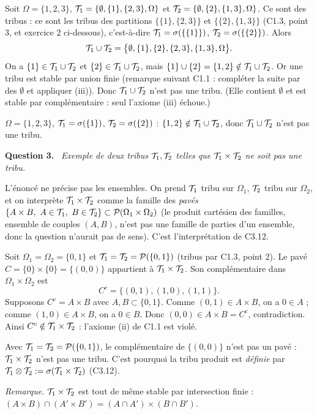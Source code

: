 \documentclass[11pt,a4paper]{article}
\newcommand{\question}[1]{\par\medskip\noindent\textbf{Question #1.}~}
\begin{document}
\begin{exo}
Soit $\Omega=\{1,2,3\}$, $\mathcal{T}_1=\{\emptyset,\{1\},\{2,3\},\Omega\}$ et $\mathcal{T}_2=\{\emptyset,\{2\},\{1,3\},\Omega\}$.
Ce sont des tribus : ce sont les tribus des partitions $\{\{1\},\{2,3\}\}$ et $\{\{2\},\{1,3\}\}$ (C1.3, point 3, et
exercice 2 ci-dessous), c'est-à-dire $\mathcal{T}_1=\sigma(\{\{1\}\})$, $\mathcal{T}_2=\sigma(\{\{2\}\})$. Alors
\[\mathcal{T}_1\cup\mathcal{T}_2=\bigl\{\emptyset,\{1\},\{2\},\{2,3\},\{1,3\},\Omega\bigr\}.\]
On a $\{1\}\in\mathcal{T}_1\cup\mathcal{T}_2$ et $\{2\}\in\mathcal{T}_1\cup\mathcal{T}_2$, mais $\{1\}\cup\{2\}=\{1,2\}\notin\mathcal{T}_1\cup\mathcal{T}_2$.
Or une tribu est stable par union finie (remarque suivant C1.1 : compléter la suite par des $\emptyset$ et appliquer (iii)).
Donc $\mathcal{T}_1\cup\mathcal{T}_2$ n'est pas une tribu. (Elle contient $\emptyset$ et est stable par complémentaire : seul l'axiome (iii) échoue.)
\begin{resultat}
$\Omega=\{1,2,3\}$, $\mathcal{T}_1=\sigma(\{1\})$, $\mathcal{T}_2=\sigma(\{2\})$ : $\{1,2\}\notin\mathcal{T}_1\cup\mathcal{T}_2$, donc $\mathcal{T}_1\cup\mathcal{T}_2$ n'est pas une tribu.
\end{resultat}

\question{3} \emph{Exemple de deux tribus $\mathcal{T}_1,\mathcal{T}_2$ telles que $\mathcal{T}_1\times\mathcal{T}_2$ ne soit pas une tribu.}

\begin{alerte}
L'énoncé ne précise pas les ensembles. On prend $\mathcal{T}_1$ tribu sur $\Omega_1$, $\mathcal{T}_2$ tribu sur $\Omega_2$, et on interprète
$\mathcal{T}_1\times\mathcal{T}_2$ comme la famille des \emph{pavés} $\{A\times B,\ A\in\mathcal{T}_1,\ B\in\mathcal{T}_2\}\subset\mathcal{P}(\Omega_1\times\Omega_2)$
(le produit cartésien des familles, ensemble de couples $(A,B)$, n'est pas une famille de parties d'un ensemble, donc la question
n'aurait pas de sens). C'est l'interprétation de C3.12.
\end{alerte}

Soit $\Omega_1=\Omega_2=\{0,1\}$ et $\mathcal{T}_1=\mathcal{T}_2=\mathcal{P}(\{0,1\})$ (tribus par C1.3, point 2). Le pavé $C=\{0\}\times\{0\}=\{(0,0)\}$
appartient à $\mathcal{T}_1\times\mathcal{T}_2$. Son complémentaire dans $\Omega_1\times\Omega_2$ est
\[C^c=\{(0,1),(1,0),(1,1)\}.\]
Supposons $C^c=A\times B$ avec $A,B\subset\{0,1\}$. Comme $(0,1)\in A\times B$, on a $0\in A$ ; comme $(1,0)\in A\times B$, on a $0\in B$.
Donc $(0,0)\in A\times B=C^c$, contradiction. Ainsi $C^c\notin\mathcal{T}_1\times\mathcal{T}_2$ : l'axiome (ii) de C1.1 est violé.
\begin{resultat}
Avec $\mathcal{T}_1=\mathcal{T}_2=\mathcal{P}(\{0,1\})$, le complémentaire de $\{(0,0)\}$ n'est pas un pavé : $\mathcal{T}_1\times\mathcal{T}_2$ n'est pas une tribu.
C'est pourquoi la tribu produit est \emph{définie} par $\mathcal{T}_1\otimes\mathcal{T}_2:=\sigma(\mathcal{T}_1\times\mathcal{T}_2)$ (C3.12).
\end{resultat}
\textit{Remarque.} $\mathcal{T}_1\times\mathcal{T}_2$ est tout de même stable par intersection finie : $(A\times B)\cap(A'\times B')=(A\cap A')\times(B\cap B')$.


\end{exo}
\end{document}
